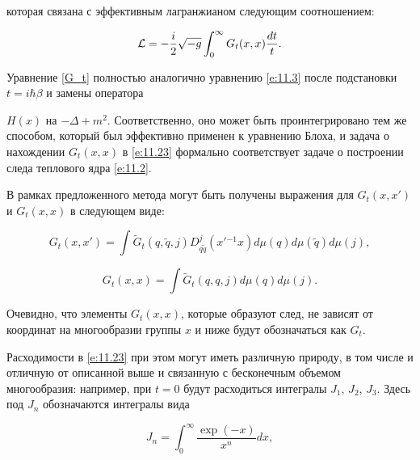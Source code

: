 которая связана с эффективным лагранжианом следующим соотношением:

\begin{equation}\label{e:11.23}

{\cal L}=-\frac{i}{2} \sqrt{-g} \int_{0}^{\infty} G_{t}(x,x) \frac{dt}{t}.

\end{equation}



Уравнение \eqref{G_t} полностью аналогично уравнению \eqref{e:11.3} после подстановки $t = i\hbar\beta$ и замены оператора

$H(x)$ на $-\Delta+m^2$. Соответственно, оно может быть проинтегрировано тем же способом, который был эффективно применен к уравнению Блоха, и задача о нахождении $G_{t}(x,x)$ в \eqref{e:11.23} формально соответствует задаче о построении следа теплового ядра \eqref{e:11.2}.



В рамках предложенного метода могут быть получены выражения для $G_{t}(x,x')$ и $G_t(x,x)$ в следующем виде:

\begin{equation}\label{Gg_t}

G_t(x,x')=\int \tilde G_t(q,\tilde q,j) D^{j}_{q \tilde q}({x'}{}^{-1}x)d\mu(q)

d\mu(\tilde q) d\mu(j),

\end{equation}

\begin{equation}\label{e:11.22}

G_t(x,x)=\int \tilde G_{t}(q,q,j) d\mu(q) d\mu(j).

\end{equation}



Очевидно, что элементы $G_t(x,x)$, которые образуют след, не зависят от координат на многообразии группы $x$ и ниже будут обозначаться как $G_t$.



Расходимости в \eqref{e:11.23} при этом могут иметь различную природу, в том числе и отличную от описанной выше и связанную с бесконечным объемом многообразия: например, при $t=0$ будут расходиться интегралы $J_1$, $J_2$, $J_3$. Здесь под $J_n$ обозначаются интегралы вида

$$

J_n = \int_{0}^{\infty} \frac{\exp(-x)}{x^{n}} dx,

$$

